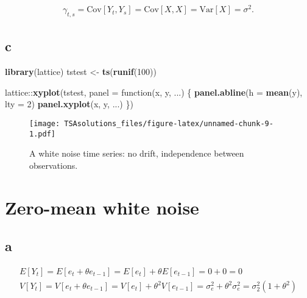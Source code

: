 \documentclass[]{book}
\newenvironment{Shaded}{\begin{snugshade}}{\end{snugshade}}
\newcommand{\KeywordTok}[1]{\textcolor[rgb]{0.13,0.29,0.53}{\textbf{{#1}}}}
\newcommand{\DataTypeTok}[1]{\textcolor[rgb]{0.13,0.29,0.53}{{#1}}}
\newcommand{\DecValTok}[1]{\textcolor[rgb]{0.00,0.00,0.81}{{#1}}}
\newcommand{\StringTok}[1]{\textcolor[rgb]{0.31,0.60,0.02}{{#1}}}
\newcommand{\NormalTok}[1]{{#1}}
\theoremstyle{definition}
\theoremstyle{definition}
\theoremstyle{remark}
\begin{document}
\begin{gather*}
  \gamma_{t,s}=\text{Cov}[Y_t, Y_s] = \text{Cov}[X,X] = \text{Var}[X] = \sigma^2.
\end{gather*}

\subsection*{c}\label{c-1}

\begin{Shaded}
\begin{Highlighting}[]
\KeywordTok{library}\NormalTok{(lattice)}
\NormalTok{tstest <-}\StringTok{ }\KeywordTok{ts}\NormalTok{(}\KeywordTok{runif}\NormalTok{(}\DecValTok{100}\NormalTok{))}

\NormalTok{lattice::}\KeywordTok{xyplot}\NormalTok{(tstest,}
                \DataTypeTok{panel =} \NormalTok{function(x, y, ...) \{}
                  \KeywordTok{panel.abline}\NormalTok{(}\DataTypeTok{h =} \KeywordTok{mean}\NormalTok{(y), }\DataTypeTok{lty =} \DecValTok{2}\NormalTok{)}
                  \KeywordTok{panel.xyplot}\NormalTok{(x, y, ...)}
                \NormalTok{\})}
\end{Highlighting}
\end{Shaded}

\begin{figure}[htbp]
\centering
\texttt{[image: TSAsolutions\_files/figure-latex/unnamed-chunk-9-1.pdf]}
\caption{\label{fig:unnamed-chunk-9}A white noise time series: no drift,
independence between observations.}
\end{figure}

\section{Zero-mean white noise}\label{zero-mean-white-noise}

\subsection*{a}\label{a-2}

\begin{gather*}
  E[Y_t] = E[e_t+\theta e_{t-1}] = E[e_t] + \theta E[e_{t-1}] = 0 + 0 = 0\\
  V[Y_t] = V[e_t + \theta e_{t-1}] =  V[e_t] + \theta^2 V[e_{t-1}] = \sigma_e^2 + \theta^2 \sigma_e^2 = \sigma_2^2(1 + \theta^2)\\
\end{gather*}
\end{document}
